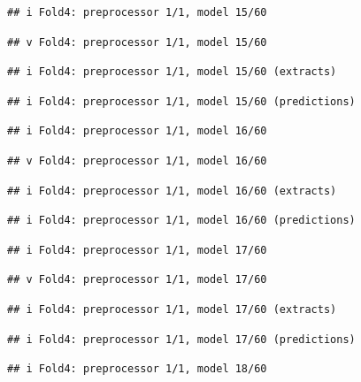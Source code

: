 \documentclass[
]{article}
\begin{document}
\begin{verbatim}
## i Fold4: preprocessor 1/1, model 15/60
\end{verbatim}

\begin{verbatim}
## v Fold4: preprocessor 1/1, model 15/60
\end{verbatim}

\begin{verbatim}
## i Fold4: preprocessor 1/1, model 15/60 (extracts)
\end{verbatim}

\begin{verbatim}
## i Fold4: preprocessor 1/1, model 15/60 (predictions)
\end{verbatim}

\begin{verbatim}
## i Fold4: preprocessor 1/1, model 16/60
\end{verbatim}

\begin{verbatim}
## v Fold4: preprocessor 1/1, model 16/60
\end{verbatim}

\begin{verbatim}
## i Fold4: preprocessor 1/1, model 16/60 (extracts)
\end{verbatim}

\begin{verbatim}
## i Fold4: preprocessor 1/1, model 16/60 (predictions)
\end{verbatim}

\begin{verbatim}
## i Fold4: preprocessor 1/1, model 17/60
\end{verbatim}

\begin{verbatim}
## v Fold4: preprocessor 1/1, model 17/60
\end{verbatim}

\begin{verbatim}
## i Fold4: preprocessor 1/1, model 17/60 (extracts)
\end{verbatim}

\begin{verbatim}
## i Fold4: preprocessor 1/1, model 17/60 (predictions)
\end{verbatim}

\begin{verbatim}
## i Fold4: preprocessor 1/1, model 18/60
\end{verbatim}
\end{document}
